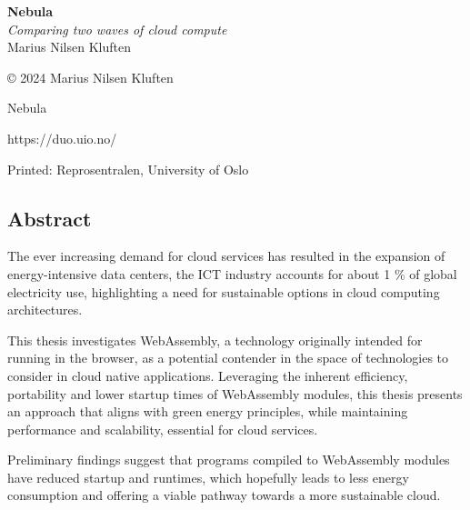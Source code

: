 \documentclass[
  table]{report}
\begin{document}
\newpage

\begin{center}
\vspace*{\fill} 
\Huge \textbf{Nebula} \\[10pt]
\vspace{2cm} 
\Large \textit{Comparing two waves of cloud compute} \\[20pt]
\vspace{2cm} 
\Large Marius Nilsen Kluften \\[30pt]
\vspace*{\fill} 
\end{center}

\newpage
\listoftodos
\newpage

\null\vfill
\begin{flushleft}
\Large © 2024 Marius Nilsen Kluften\par
\Large Nebula \par
\Large https://duo.uio.no/ \par
\Large Printed: Reprosentralen, University of Oslo \par
\end{flushleft}

\newpage
\fancyfoot[C]{ \thepage\ }

\vspace*{\fill}
\begin{center}
\begin{minipage}{0.75\textwidth}

\chapter*{Abstract}

The ever increasing demand for cloud services has resulted in the expansion of
energy-intensive data centers, the ICT industry accounts for about 1 \% of global 
electricity use, highlighting a need for sustainable options
in cloud computing architectures.

\vspace{0.25cm}

This thesis investigates WebAssembly, a technology originally intended for running 
in the browser, as a potential contender in the space of technologies to
consider in cloud native applications. Leveraging the inherent efficiency,
portability and lower startup times of WebAssembly modules, this thesis presents an
approach that aligns with green energy principles, while maintaining performance and
scalability, essential for cloud services. 

\vspace{0.25cm}

Preliminary findings suggest that programs compiled to WebAssembly modules have 
reduced startup and runtimes, which hopefully leads to less energy
consumption and offering a viable pathway towards a more sustainable cloud.

\end{minipage}
\end{center}
\vspace*{\fill}
\end{document}
